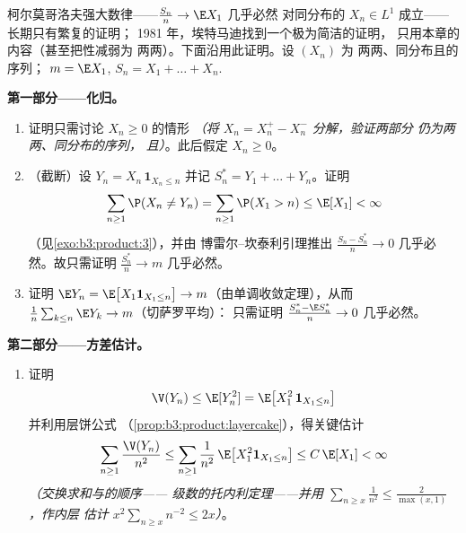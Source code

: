 \begin{problem}
\label{pb:b3:probability:1}
柯尔莫哥洛夫强大数律——$\frac{S_n}n \to \E X_1$ 几乎必然
对同分布的 $X_n \in L^1$ 成立——长期只有繁复的证明；
1981 年，埃特马迪找到一个极为简洁的证明，
只用本章的内容（甚至把性减弱为
两两）。下面沿用此证明。设 $(X_n)$ 为
两两、同分布且的序列；
$m = \E X_1$, $S_n = X_1 + \dots + X_n$.

\medskip
\noindent\textbf{第一部分——化归。}
\begin{enumerate}
  \item 证明只需讨论 $X_n \geq 0$ 的情形
        \emph{（将 $X_n = X_n^+ - X_n^-$ 分解，验证两部分
        仍为两两、同分布的序列，
        且）}。此后假定 $X_n \geq 0$。
  \item （截断）设 $Y_n = X_n\,\mathbf 1_{X_n \leq n}$
        并记 $S_n^* = Y_1 + \dots + Y_n$。证明
        \[
        \sum_{n\geq1}\P(X_n \neq Y_n) =
        \sum_{n\geq1}\P(X_1 > n) \leq \E[X_1] < \infty
        \]
        （见\cref{exo:b3:product:3}），并由
        博雷尔–坎泰利引理推出 $\frac{S_n - S_n^*}{n} \to 0$
        几乎必然。故只需证明 $\frac{S^*_n}n \to m$
        几乎必然。
  \item 证明 $\E Y_n = \E\bigl[X_1\mathbf 1_{X_1\leq
        n}\bigr] \to m$（由单调收敛定理），从而
        $\frac1n\sum_{k\leq n}\E Y_k \to m$（切萨罗平均）：
        只需证明 $\frac{S_n^* - \E S_n^*}{n} \to 0$
        几乎必然。
\end{enumerate}

\medskip
\noindent\textbf{第二部分——方差估计。}
\begin{enumerate}[resume]
  \item 证明
        \[
        \V(Y_n) \leq \E[Y_n^2] = \E\bigl[X_1^2\,\mathbf
        1_{X_1 \leq n}\bigr]
        \]
        并利用层饼公式
        （\cref{prop:b3:product:layercake}），得关键估计
        \[
        \sum_{n\geq1}\frac{\V(Y_n)}{n^2}
        \leq \sum_{n\geq1}\frac1{n^2}\,
        \E\bigl[X_1^2\mathbf 1_{X_1\leq n}\bigr]
        \leq C\,\E[X_1] < \infty
        \]
        \emph{（交换求和与的顺序——
        级数的托内利定理——并用 $\sum_{n \geq
        x}\frac1{n^2} \leq \frac2{\max(x,1)}$，作内层
        估计 $x^2\sum_{n\geq x}n^{-2} \leq 2x$）}。
\end{enumerate}


\end{problem}
